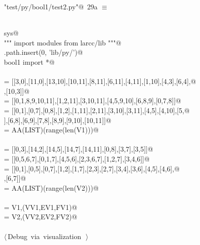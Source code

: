 \documentclass[11pt,oneside]{article}	%
\begin{document}
\begin{flushleft} \small \label{scrap36}
\protect{}\verb@"test/py/bool1/test2.py"@\nobreak\ {\footnotesize 29a }$\equiv$
\vspace{-1ex}
\begin{list}{}{} \item
\mbox{}\verb@@\\
\mbox{}\verb@import sys@\\
\mbox{}\verb@""" import modules from larcc/lib """@\\
\mbox{}\verb@sys.path.insert(0, 'lib/py/')@\\
\mbox{}\verb@from bool1 import *@\\
\mbox{}\verb@@\\
\mbox{} = [[3,0],[11,0],[13,10],[10,11],[8,11],[6,11],[4,11],[1,10],[4,3],[6,4],@\\
\mbox{}\verb@      [8,4],[10,3]]@\\
\mbox{} = [[0,1,8,9,10,11],[1,2,11],[3,10,11],[4,5,9,10],[6,8,9],[0,7,8]]@\\
\mbox{} = [[0,1],[0,7],[0,8],[1,2],[1,11],[2,11],[3,10],[3,11],[4,5],[4,10],[5,@\\
\mbox{}],[6,8],[6,9],[7,8],[8,9],[9,10],[10,11]]@\\
\mbox{} = AA(LIST)(range(len(V1)))@\\
\mbox{}\verb@@\\
\mbox{} = [[0,3],[14,2],[14,5],[14,7],[14,11],[0,8],[3,7],[3,5]]@\\
\mbox{} = [[0,5,6,7],[0,1,7],[4,5,6],[2,3,6,7],[1,2,7],[3,4,6]]@\\
\mbox{} = [[0,1],[0,5],[0,7],[1,2],[1,7],[2,3],[2,7],[3,4],[3,6],[4,5],[4,6],@\\
\mbox{}\verb@      [5,6],[6,7]]@\\
\mbox{} = AA(LIST)(range(len(V2)))@\\
\mbox{}\verb@@\\
\mbox{} = V1,(VV1,EV1,FV1)@\\
\mbox{} = V2,(VV2,EV2,FV2)@\\
\mbox{}\verb@@\\
\mbox{}\verb@@\hbox{$\langle\,$Debug via visualization\nobreak\ {\footnotesize {}}$\,\rangle$}\verb@@\\
\mbox{}\verb@@{\NWsep}
\end{list}
\vspace{-2ex}
\end{flushleft}
\end{document}
